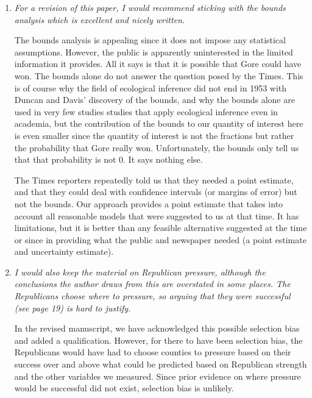 \documentclass[11pt]{article}
\begin{document}
\begin{enumerate}
\item {\it For a revision of this paper, I would recommend sticking
    with the bounds analysis which is excellent and nicely written.}
  
  The bounds analysis is appealing since it does not impose any
  statistical assumptions.  However, the public is apparently
  uninterested in the limited information it provides.  All it says is
  that it is possible that Gore could have won.  The bounds alone do
  not answer the question posed by the Times.  This is of course why
  the field of ecological inference did not end in 1953 with Duncan
  and Davis' discovery of the bounds, and why the bounds alone are
  used in very few studies studies that apply ecological inference
  even in academia, but the contribution of the bounds to our quantity
  of interest here is even smaller since the quantity of interest is
  not the fractions but rather the probability that Gore really won.
  Unfortunately, the bounds only tell us that that probability is not
  0.  It says nothing else.
  
  The Times reporters repeatedly told us that they needed a point
  estimate, and that they could deal with confidence intervals (or
  margins of error) but not the bounds.  Our approach provides a point
  estimate that takes into account all reasonable models that were
  suggested to us at that time.  It has limitations, but it is better
  than any feasible alternative suggested at the time or since in
  providing what the public and newspaper needed (a point estimate and
  uncertainty estimate).
 
\item {\it I would also keep the material on Republican pressure,
    although the conclusions the author draws from this are overstated
    in some places.  The Republicans choose where to pressure, so
    arguing that they were successful (see page 19) is hard to
    justify.}
  
  In the revised manuscript, we have acknowledged this possible
  selection bias and added a qualification.  However, for there to
  have been selection bias, the Republicans would have had to choose
  counties to pressure based on their success over and above what
  could be predicted based on Republican strength and the other
  variables we measured.  Since prior evidence on where pressure
  would be successful did not exist, selection bias is unlikely.
\end{enumerate}

\bigskip
{}
\end{document}
